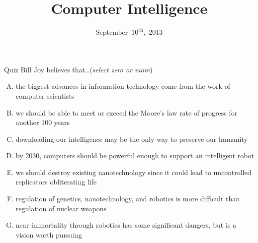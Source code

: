 \documentclass{beamer}
\title{Computer Intelligence}
\date{September~$10^{\text{th}}$,~2013}
\begin{document}
\begin{frame}
\titlepage
\end{frame}

\begin{frame}{Quiz}
Bill Joy believes that\ldots \hfill (\emph{select zero or more})
\begin{enumerate}[(A)]
\item<1> the biggest advances in information technology come from the work of computer scientists %
\item<1> we should be able to meet or exceed the Moore's law rate of progress for another 100 years %
\item<1> downloading our intelligence may be the only way to preserve our humanity %
\item<1-2> by 2030, computers should be powerful enough to support an intelligent robot
\item<1> we should destroy existing nanotechnology since it could lead to uncontrolled replicators obliterating life %
\item<1-2> regulation of genetics, nanotechnology, and robotics is more difficult than regulation of nuclear weapons %
\item<1> near immortality through robotics has some significant dangers, but is a vision worth pursuing
\end{enumerate}
\end{frame}
\end{document}
